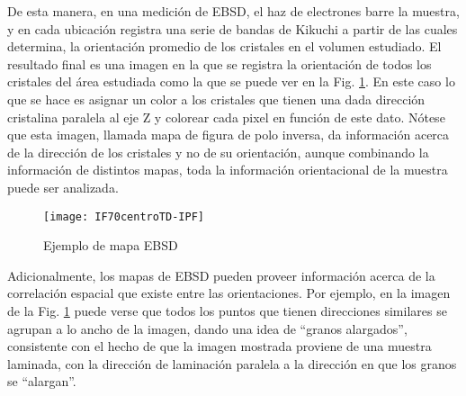 De esta manera, en una medición de EBSD, el haz de electrones barre la muestra, y en cada ubicación registra una serie de bandas de Kikuchi a partir de las cuales determina, la orientación promedio de los cristales en el volumen estudiado.
El resultado final es una imagen en la que se registra la orientación de todos los cristales del área estudiada como la que se puede ver en la Fig. \ref{fig:ebsdex}. 
En este caso lo que se hace es asignar un color a los cristales que tienen una dada dirección cristalina paralela al eje Z y colorear cada pixel en función de este dato. 
Nótese que esta imagen, llamada mapa de figura de polo inversa, da información acerca de la dirección de los cristales y no de su orientación, aunque combinando la información de distintos mapas, toda la información orientacional de la muestra puede ser analizada.
\begin{figure}[!htb]
  \centering
  \texttt{[image: IF70centroTD-IPF]}
  \caption{Ejemplo de mapa EBSD}
  \label{fig:ebsdex}
\end{figure}

Adicionalmente, los mapas de EBSD pueden proveer información acerca de la correlación espacial que existe entre las orientaciones. 
Por ejemplo, en la imagen de la Fig. \ref{fig:ebsdex} puede verse que todos los puntos que tienen direcciones similares se agrupan a lo ancho de la imagen, dando una idea de ``granos alargados'', consistente con el hecho de que la imagen mostrada proviene de una muestra laminada, con la dirección de laminación paralela a la dirección en que los granos se ``alargan''.

